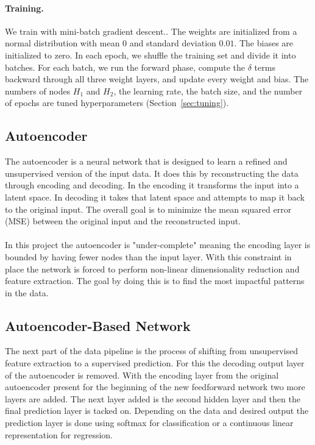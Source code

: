 \documentclass[twoside,11pt]{article}
\begin{document}
\paragraph{Training.} We train with mini-batch gradient descent.. The weights are initialized from a normal distribution with mean $0$ and standard deviation $0.01$. The biases are initialized to zero. In each epoch, we shuffle the training set and divide it into batches. For each batch, we run the forward phase, compute the $\delta$ terms backward through all three weight layers, and update every weight and bias. The numbers of nodes $H_1$ and $H_2$, the learning rate, the batch size, and the number of epochs are tuned hyperparameters (Section~\ref{sec:tuning}).

\subsection{Autoencoder}
The autoencoder is a neural network that is designed to learn a refined and unsupervised version of the input data. It does this by reconstructing the data through encoding and decoding. In the encoding it transforms the input into a latent space. In decoding it takes that latent space and attempts to map it back to the original input. The overall goal is to minimize the mean squared error (MSE) between the original input and the reconstructed input. 

\paragraph{}
In this project the autoencoder is "under-complete" meaning the encoding layer is bounded by having fewer nodes than the input layer. With this constraint in place the network is forced to perform non-linear dimensionality reduction and feature extraction. The goal by doing this is to find the most impactful patterns in the data.

\subsection{Autoencoder-Based Network}
The next part of the data pipeline is the process of shifting from unsupervised feature extraction to a supervised prediction. For this the decoding output layer of the autoencoder is removed. With the encoding layer from the original autoencoder present for the beginning of the new feedforward network two more layers are added. The next layer added is the second hidden layer and then the final prediction layer is tacked on. Depending on the data and desired output the prediction layer is done using softmax for classification or a continuous linear representation for regression.
\end{document}
